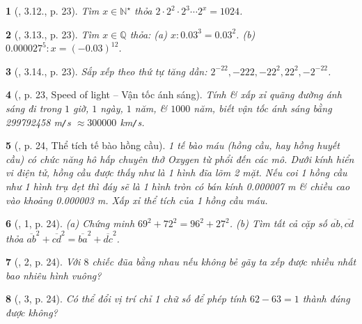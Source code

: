 \documentclass{article}
\newtheorem{baitoan}{}
\begin{document}
\begin{baitoan}[\cite{Binh_boi_duong_Toan_7_tap_1}, 3.12., p. 23]
	Tìm $x\in\mathbb{N}^\star$ thỏa $2\cdot2^2\cdot2^3\cdots2^x = 1024$.
\end{baitoan}

\begin{baitoan}[\cite{Binh_boi_duong_Toan_7_tap_1}, 3.13., p. 23]
	Tìm $x\in\mathbb{Q}$ thỏa: (a) $x:0.03^3 = 0.03^2$. (b) $0.000027^5:x = (-0.03)^{12}$.
\end{baitoan}

\begin{baitoan}[\cite{Binh_boi_duong_Toan_7_tap_1}, 3.14., p. 23]
	Sắp xếp theo thứ tự tăng dần: $2^{-22},-222,-22^2,22^2,-2^{-22}$.
\end{baitoan}

\begin{baitoan}[\cite{Binh_boi_duong_Toan_7_tap_1}, p. 23, Speed of light -- Vận tốc ánh sáng]
	Tính \& xấp xỉ quãng đường ánh sáng đi trong $1$ giờ, $1$ ngày, $1$ năm, \& $1000$ năm, biết vận tốc ánh sáng bằng {\rm299792458 m{\tt/}s} $\approx300000$ {\rm km{\tt/}s}.
\end{baitoan}

\begin{baitoan}[\cite{Binh_boi_duong_Toan_7_tap_1}, p. 24, Thể tích tế bào hồng cầu]
	1 tế bào máu (hồng cầu, hay hồng huyết cầu) có chức năng hô hấp chuyên thở Oxygen từ phổi đến các mô. Dưới kính hiển vi điện tử, hồng cầu được thấy như là 1 hình đĩa lõm 2 mặt. Nếu coi 1 hồng cầu như 1 hình trụ dẹt thì đáy sẽ là 1 hình tròn có bán kính {\rm0.000007 m} \& chiều cao vào khoảng {\rm0.000003 m}. Xấp xỉ thể tích của 1 hồng cầu máu.
\end{baitoan}

\begin{baitoan}[\cite{Binh_boi_duong_Toan_7_tap_1}, 1, p. 24]
	(a) Chứng minh $69^2 + 72^2 = 96^2 + 27^2$. (b) Tìm tất cả cặp số $\overline{ab},\overline{cd}$ thỏa $\overline{ab}^2 + \overline{cd}^2 = \overline{ba}^2 + \overline{dc}^2$.
\end{baitoan}

\begin{baitoan}[\cite{Binh_boi_duong_Toan_7_tap_1}, 2, p. 24]
	Với $8$ chiếc đũa bằng nhau nếu không bẻ gãy ta xếp được nhiều nhất bao nhiêu hình vuông?
\end{baitoan}

\begin{baitoan}[\cite{Binh_boi_duong_Toan_7_tap_1}, 3, p. 24]
	Có thể đổi vị trí chỉ 1 chữ số để phép tính $62 - 63 = 1$ thành đúng được không?
\end{baitoan}
\end{document}
